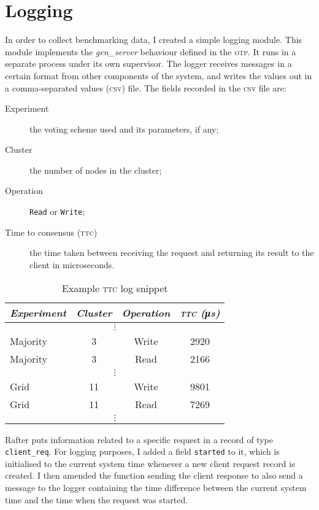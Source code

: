\documentclass[12pt,chapterprefix=true,toc=bibliography,numbers=noendperiod,
               footnotes=multiple,twoside]{scrreprt}
\begin{document}
\section{Logging}
\label{sc:logging}

In order to collect benchmarking data, I created a simple logging module. This module implements the \emph{gen\_server} behaviour defined in the \textsc{otp}. It runs in a separate process under its own supervisor. The logger receives messages in a certain format from other components of the system, and writes the values out in a comma-separated values (\textsc{csv}) file. The fields recorded in the \textsc{csv} file are:

\begin{description}
    \item[Experiment] the voting scheme used and its parameters, if any;
    \item[Cluster] the number of nodes in the cluster;
    \item[Operation] \texttt{Read} or \texttt{Write};
    \item[Time to consensus (\textsc{ttc})] the time taken between receiving the request and returning its result to the client in microseconds.
\end{description}

\begin{table}[h]
    \centering
    \begin{tabular}{l c c c}
        \toprule
        \textit{Experiment} & \textit{Cluster} & \textit{Operation} & \textit{\textsc{ttc} (\si{\micro\second})} \\
        \midrule
        \multicolumn{4}{c}{\(\vdots\)} \\
        Majority & 3 & Write & 2920 \\
        Majority & 3 & Read & 2166 \\
        \multicolumn{4}{c}{\(\vdots\)} \\
        Grid & 11 & Write & 9801 \\
        Grid & 11 & Read & 7269 \\
        \multicolumn{4}{c}{\(\vdots\)} \\
        \bottomrule
    \end{tabular}
    \caption[Example TTC log snippet]{Example \textsc{ttc} log snippet}
    \label{tab:csv}
\end{table}

Rafter puts information related to a specific request in a record of type \texttt{client\_req}. For logging purposes, I added a field \texttt{started} to it, which is initialised to the current system time whenever a new client request record is created. I then amended the function sending the client response to also send a message to the logger containing the time difference between the current system time and the time when the request was started.
\end{document}
